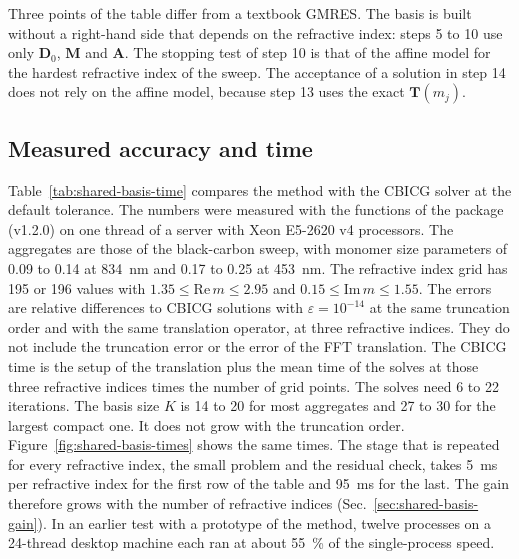 \documentclass[11pt,a4paper]{article}
\begin{document}
Three points of the table differ from a textbook GMRES.
The basis is built without a right-hand side that depends on the refractive index: steps 5 to 10 use only $\mathbf{D}_0$, $\mathbf{M}$ and $\mathbf{A}$.
The stopping test of step 10 is that of the affine model for the hardest refractive index of the sweep.
The acceptance of a solution in step 14 does not rely on the affine model, because step 13 uses the exact $\mathbf{T}(m_j)$.

\subsection{Measured accuracy and time}
Table~\ref{tab:shared-basis-time} compares the method with the CBICG solver at the default tolerance.
The numbers were measured with the functions of the package (v1.2.0) on one thread of a server with Xeon E5-2620 v4 processors.
The aggregates are those of the black-carbon sweep, with monomer size parameters of 0.09 to 0.14 at \SI{834}{\nano\meter} and 0.17 to 0.25 at \SI{453}{\nano\meter}.
The refractive index grid has 195 or 196 values with $1.35 \leq \mathrm{Re}\,m \leq 2.95$ and $0.15 \leq \mathrm{Im}\,m \leq 1.55$.
The errors are relative differences to CBICG solutions with $\varepsilon = 10^{-14}$ at the same truncation order and with the same translation operator, at three refractive indices.
They do not include the truncation error or the error of the FFT translation.
The CBICG time is the setup of the translation plus the mean time of the solves at those three refractive indices times the number of grid points.
The solves need 6 to 22 iterations.
The basis size $K$ is 14 to 20 for most aggregates and 27 to 30 for the largest compact one.
It does not grow with the truncation order.
Figure~\ref{fig:shared-basis-times} shows the same times.
The stage that is repeated for every refractive index, the small problem and the residual check, takes \SI{5}{\milli\second} per refractive index for the first row of the table and \SI{95}{\milli\second} for the last.
The gain therefore grows with the number of refractive indices (Sec.~\ref{sec:shared-basis-gain}).
In an earlier test with a prototype of the method, twelve processes on a 24-thread desktop machine each ran at about \SI{55}{\percent} of the single-process speed.
\end{document}
